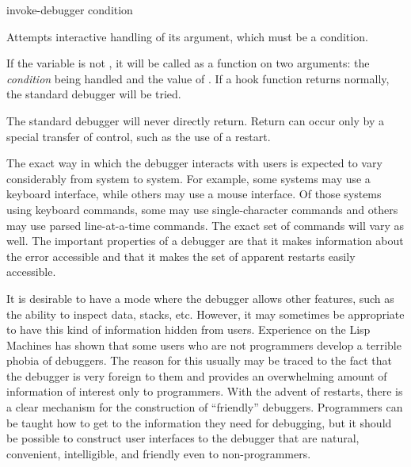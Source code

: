 \begin{defun}[Function]
invoke-debugger condition

  Attempts interactive handling of its argument, which must be a condition.

  If the variable  is not , it will be called as a function on two
  arguments: the \emph{condition} being handled and the value of .
  If a hook function returns normally, the standard debugger will be tried.

  The standard debugger will never directly return. Return can occur only by a
  special transfer of control, such as the use of a restart.

\beforenoterule
\begin{sideremark}
    The exact way in which the debugger interacts with users is expected to
    vary considerably from system to system. For example, some systems may
    use a keyboard interface, while others may use a mouse interface. Of those
    systems using keyboard commands, some may use single-character commands
    and others may use parsed line-at-a-time commands. The exact set of commands
    will vary as well. The important properties of a debugger are that
it makes information about the error accessible and that
it makes the set of apparent restarts easily accessible.

    It is desirable to have a mode where the debugger allows other features,
    such as the ability to inspect data, stacks, etc. However, it may
    sometimes be appropriate to have this kind of information hidden from
    users. Experience on the Lisp Machines has shown that some users who are
    not programmers develop a terrible phobia of debuggers. The reason for
    this usually may be traced to the fact that the debugger is very foreign to them
    and provides an overwhelming amount of information of
    interest only to programmers. With the advent of restarts, there is a clear
    mechanism for the construction of ``friendly'' debuggers. Programmers can
    be taught how to get to the information they need for debugging, but it
    should be possible to construct user interfaces to the debugger that are
    natural, convenient, intelligible, and friendly even to non-programmers.
\end{sideremark}
\afternoterule
\end{defun}

